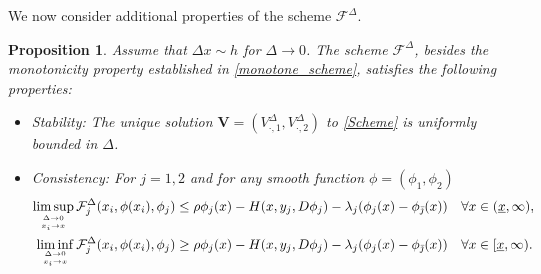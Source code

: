 \documentclass[11pt]{article}
\numberwithin{equation}{section}
\newcommand{\br}{\color{red}}
\newtheorem{proposition}[theorem]{Proposition}
\theoremstyle{Claim}
\newcommand{\N}{\mathbb{N}}
\def\bV{{\mathbf{V}}}
\def\bjm{{\bar{\jmath}}}
\newcommand{\ux}{{\underline x}}
\theoremstyle{plain}
\newcommand{\D}{\Delta}
\begin{document}
We now consider additional properties of the scheme $\mathcal{F}^\D$.
\begin{proposition}\label{prop_scheme}
Assume that $\D x\sim h$ for $\D\to 0$. The scheme $\mathcal{F}^\D$, besides the monotonicity property established in \cref{monotone_scheme}, satisfies the following properties:
\begin{itemize}
\item[]{\em  Stability: } The unique  solution $\bV=(V^\D_{\cdot,1},V^\D_{\cdot,2})$ to \cref{Scheme} is uniformly bounded in $\D$.
	
	\item[]{\em  Consistency: } For $j=1,2$ and for any
	smooth function $\phi=(\phi_1,\phi_2)$
	\begin{align*}
			\limsup_{{\D\to 0}\atop{x_i\to x} } \mathcal{F}^\D_j(x_i,\phi(x_i),\phi_{j})  & \leq  \rho \phi_{j}(x)- H(x,y_j,D\phi_{j})-\lambda_j(\phi_{j}(x)-\phi_{\bar \jmath}(x))
		 \quad \forall x\in(\ux,\infty),\\
		\liminf_{{\D\to 0}\atop{x_i\to x}} \mathcal{F}^\D_j(x_i,\phi(x_i),\phi_{j})    &\geq \rho \phi_{j}(x)- H(x,y_j,D\phi_{j})-\lambda_j(\phi_{j}(x)-\phi_{\bar \jmath}(x)) 
	    \quad \forall x\in[\ux,\infty).
	\end{align*}
	\end{itemize}
\end{proposition}
\end{document}

